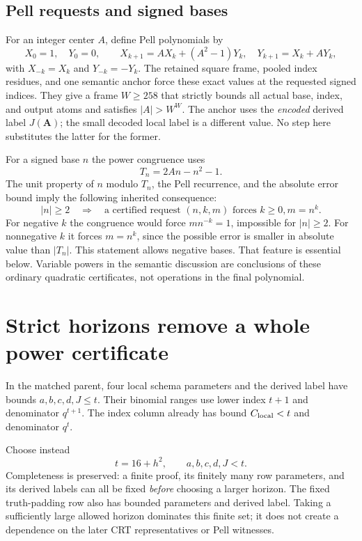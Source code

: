 \documentclass[11pt]{article}
\theoremstyle{definition}
\begin{document}
\subsection{Pell requests and signed bases}

For an integer center $A$, define Pell polynomials by
\[
X_0=1,\quad Y_0=0,\qquad
X_{k+1}=AX_k+(A^2-1)Y_k,\quad
Y_{k+1}=X_k+AY_k,
\]
with $X_{-k}=X_k$ and $Y_{-k}=-Y_k$. The retained square frame,
pooled index residues, and one semantic anchor force these exact values
at the requested signed indices. They give a frame $W\ge258$ that
strictly bounds all actual base, index, and output atoms and satisfies
$|A|>W^W$. The anchor uses the \emph{encoded} derived label
$J(\boldsymbol A)$; the small decoded local label is a different value.
No step here substitutes the latter for the former.

For a signed base $n$ the power congruence uses
\[
T_n=2An-n^2-1.
\]
The unit property of $n$ modulo $T_n$, the Pell recurrence, and the
absolute error bound imply the following inherited consequence:
\begin{equation}\label{eq:signed-power}
|n|\ge2\quad\Longrightarrow\quad
\text{a certified request }(n,k,m)\text{ forces }k\ge0, m=n^k.
\end{equation}
For negative $k$ the congruence would force $mn^{-k}=1$, impossible
for $|n|\ge2$. For nonnegative $k$ it forces $m=n^k$, since the
possible error is smaller in absolute value than $|T_n|$.
This statement allows negative bases. That feature is essential below.
Variable powers in the semantic discussion are conclusions of these
ordinary quadratic certificates, not operations in the final polynomial.

\section{Strict horizons remove a whole power certificate}
\label{sec:strict}

In the matched parent, four local schema parameters and the derived
label have bounds $a,b,c,d,J\le t$. Their binomial ranges use lower
index $t+1$ and denominator $q^{t+1}$. The index column already has
bound $C_{\rm local}<t$ and denominator $q^t$.

Choose instead
\begin{equation}\label{eq:strict}
t=16+h^2,\qquad a,b,c,d,J<t.
\end{equation}
Completeness is preserved: a finite proof, its finitely many row
parameters, and its derived labels can all be fixed \emph{before}
choosing a larger horizon. The fixed truth-padding row also has bounded
parameters and derived label. Taking a sufficiently large allowed
horizon dominates this finite set; it does not create a dependence on
the later CRT representatives or Pell witnesses.
\end{document}
